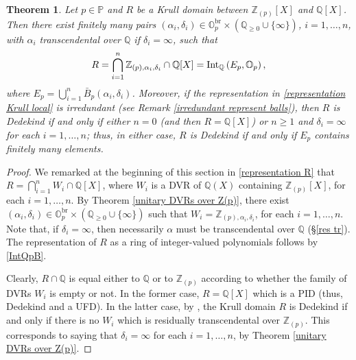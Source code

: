 \documentclass[10pt]{article}
\numberwithin{equation}{section}
\newtheorem{Thm}[equation]{Theorem}
\theoremstyle{definition}
\theoremstyle{definition}
\newcommand{\Q}{\mathbb{Q}}
\newcommand{\Z}{\mathbb{Z}}
\renewcommand{\O}{\mathbb{O}}
\newcommand{\PP}{\mathbb{P}}
\newcommand{\Int}{\textnormal{Int}}
\newcommand{\IntQ}{\Int_{\Q}}
\newcommand{\br}{\text{br}}
\newcommand\rc { \color{red}}
\newcommand\bc { \color{blue}}
\begin{document}
\begin{Thm} \label{thm4.23}
Let $p\in\PP$ and  $R$ be a Krull domain  between $\Z_{(p)}[X]$ and $\Q[X]$. Then there exist finitely many pairs $(\alpha_i,\delta_i)\in\O_p^{\br}\times(\Q_{\geq0}\cup\{\infty\})$,  $i=1,\ldots,n$, with  $\alpha_i$ transcendental over $\Q$ if $\delta_i=\infty$, such that
\begin{equation}\label{representation Krull local}
    R=\bigcap_{i=1}^n\Z_{(p),\alpha_i,\delta_i}\cap\Q[X]=\IntQ\left(E_p,\O_p\right),
\end{equation}
where $E_p = \bigcup\limits_{i=1}^n \bar B_p(\alpha_i,\delta_i)$. Moreover, 
if the representation in \eqref{representation Krull local} is irredundant (see Remark \ref{irredundant represent balls}),
then $R$ is Dedekind if and only if either $n=0$ (and then $R=\Q[X]$) or $n\geq1$ and  $\delta_i=\infty$ for each $i=1,\ldots,n$;  thus, in either case, $R$ is Dedekind if and only if $E_p$ contains finitely many elements.
\end{Thm}
\begin{proof}
We remarked at the beginning of this section in \eqref{representation R} that $R=\bigcap\limits_{i=1}^n W_i\cap\Q[X]$, where $W_i$ is a DVR of $\Q(X)$ containing $\Z_{(p)}[X]$, for each $i=1,\ldots,n$.  By Theorem \ref{unitary DVRs over Z(p)},  there exist $(\alpha_i,\delta_i)\in\O_p^{\br}\times(\Q_{\geq0}\cup\{\infty\})$ such that $W_i=\Z_{(p),\alpha_i,\delta_i}$, for each $i=1,\ldots,n$. Note that, if $\delta_i=\infty$, then necessarily $\alpha$ must be transcendental over $\Q$ (\S \ref{res tr}). The representation of $R$ as a ring of integer-valued polynomials follows by \eqref{IntQpB}.

Clearly, $R\cap\Q$ is equal either to $\Q$ or to $\Z_{(p)}$ according to whether the family of DVRs $W_i$ is empty or not. In the former case, $R=\Q[X]$ which is a PID (thus, Dedekind and a UFD). In the latter case, by \cite[Theorem 3.14]{PerPrufer}, the Krull domain $R$ is Dedekind if and only if there is no $W_i$ which is residually transcendental over $\Z_{(p)}$. This corresponds to saying that $\delta_i=\infty$ for each $i=1,\ldots,n$, by Theorem \ref{unitary DVRs over Z(p)}.

\end{proof}
\end{document}
